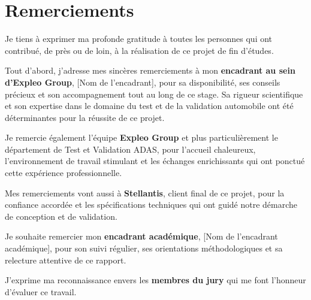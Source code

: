 \documentclass[12pt,a4paper,twoside]{report}
\begin{document}


\chapter*{Remerciements}

\vspace{1cm}

Je tiens à exprimer ma profonde gratitude à toutes les personnes qui ont contribué, de près ou de loin, à la réalisation de ce projet de fin d'études.

\vspace{0.5cm}

Tout d'abord, j'adresse mes sincères remerciements à mon \textbf{encadrant au sein d'Expleo Group}, [Nom de l'encadrant], pour sa disponibilité, ses conseils précieux et son accompagnement tout au long de ce stage. Sa rigueur scientifique et son expertise dans le domaine du test et de la validation automobile ont été déterminantes pour la réussite de ce projet.

\vspace{0.5cm}

Je remercie également l'équipe \textbf{Expleo Group} et plus particulièrement le département de Test et Validation ADAS, pour l'accueil chaleureux, l'environnement de travail stimulant et les échanges enrichissants qui ont ponctué cette expérience professionnelle.

\vspace{0.5cm}

Mes remerciements vont aussi à \textbf{Stellantis}, client final de ce projet, pour la confiance accordée et les spécifications techniques qui ont guidé notre démarche de conception et de validation.

\vspace{0.5cm}

Je souhaite remercier mon \textbf{encadrant académique}, [Nom de l'encadrant académique], pour son suivi régulier, ses orientations méthodologiques et sa relecture attentive de ce rapport.

\vspace{0.5cm}

J'exprime ma reconnaissance envers les \textbf{membres du jury} qui me font l'honneur d'évaluer ce travail.
\end{document}

